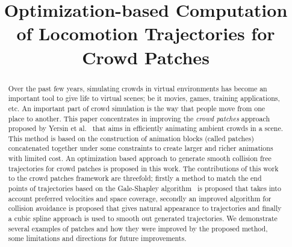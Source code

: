 \documentclass[review]{acmsiggraph}
\title{Optimization-based Computation of Locomotion Trajectories for Crowd Patches}
\author{
}
\newcommand{\etal}{et al.\xspace}
\begin{document}

\maketitle

\begin{abstract}

Over the past few years, simulating crowds in virtual environments has become an important tool to give life to virtual scenes; be it movies, games, training applications, etc.
An important part of crowd simulation is the way that people
move from one place to another.
This paper concentrates in improving the \emph{crowd patches} approach proposed by Yersin \etal~\cite{Yersin:2009} that aims in efficiently animating ambient crowds in a scene.
This method is based on the construction of animation blocks (called patches) concatenated together under some constraints to create larger and richer animations with limited cost.
An optimization based approach to generate smooth collision free trajectories for crowd patches is proposed in this work.
The contributions of this work to the crowd patches framework are threefold; firstly a method to match the end points of trajectories based on the Gale-Shapley algorithm~\cite{gale1962college} is proposed that takes into account preferred velocities and space coverage, secondly an improved algorithm for collision avoidance is proposed that gives natural appearance to trajectories and finally a cubic spline approach is used to smooth out generated trajectories.
We demonstrate several examples of patches and how they were improved by the proposed method, some limitations and directions for future improvements.

\end{abstract}
\end{document}
